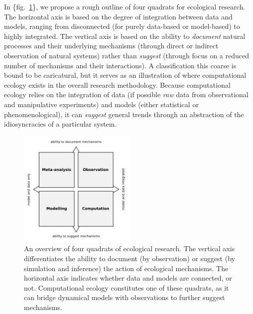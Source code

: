 \documentclass[11pt,serif]{article}
\begin{document}
In \{fig.~\ref{fig:quadrats}\}, we propose a rough outline of four
quadrats for ecological research. The horizontal axis is based on the
degree of integration between data and models, ranging from disconnected
(for purely data-based or model-based) to highly integrated. The
vertical axis is based on the ability to \emph{document} natural
processes and their underlying mechanisms (through direct or indirect
observation of natural systems) rather than \emph{suggest} (through
focus on a reduced number of mechanisms and their interactions). A
classification this coarse is bound to be caricatural, but it serves as
an illustration of where computational ecology exists in the overall
research methodology. Because computational ecology relies on the
integration of data (if possible \emph{raw} data from observational and
manipulative experiments) and models (either statistical or
phenomenological), it can \emph{suggest} general trends through an
abstraction of the idiosyncracies of a particular system.

\begin{figure}
\centering
\includegraphics[width=0.50000\textwidth]{figures/fourquads.png}
\caption{An overview of four quadrats of ecological research. The
vertical axis differentiates the ability to document (by observation) or
suggest (by simulation and inference) the action of ecological
mechanisms. The horizontal axis indicates whether data and models are
connected, or not. Computational ecology constitutes one of these
quadrats, as it can bridge dynamical models with observations to further
suggest mechanisms.}\label{fig:quadrats}
\end{figure}
\end{document}
